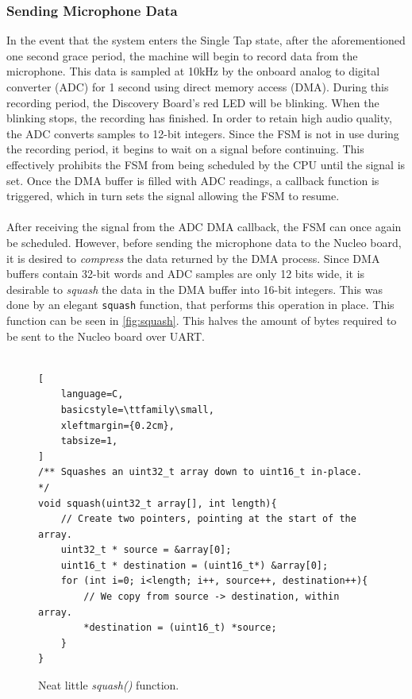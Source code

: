 \subsubsection{Sending Microphone Data}
In the event that the system enters the Single Tap state, after the aforementioned one second grace
period, the machine will begin to record data from the microphone. This data is sampled at 10kHz by
the onboard analog to digital converter (ADC) for 1 second using direct memory access (DMA). During
this recording period, the Discovery Board's red LED will be blinking. When the blinking stops, the
recording has finished. In
order to retain high audio quality, the ADC converts samples to 12-bit integers. Since
the FSM is not in use during the recording period, it begins to wait on a signal before continuing.
This effectively prohibits the FSM from being scheduled by the CPU until the signal is set. Once
the DMA buffer is filled with ADC readings, a callback function is triggered, which in turn sets the
signal allowing the FSM to resume.\\\\
After receiving the signal from the ADC DMA callback, the FSM can once again be scheduled. However,
before sending the microphone data to the Nucleo board, it is desired to \textit{compress} the data
returned by the DMA process. Since DMA buffers contain 32-bit words and ADC samples are only 12 bits
wide, it is desirable to \textit{squash} the data in the DMA buffer into 16-bit integers. This was
done by an elegant \texttt{squash} function, that performs this operation in place. This function can be seen in \autoref{fig:squash}. This halves the
amount of bytes required to be sent to the Nucleo board over UART.\\\\

\begin{figure}[h]
\begin{lstlisting}[
	language=C,
	basicstyle=\ttfamily\small,
	xleftmargin={0.2cm},
	tabsize=1,
]
/** Squashes an uint32_t array down to uint16_t in-place. */
void squash(uint32_t array[], int length){
	// Create two pointers, pointing at the start of the array.
	uint32_t * source = &array[0];
	uint16_t * destination = (uint16_t*) &array[0];
	for (int i=0; i<length; i++, source++, destination++){
		// We copy from source -> destination, within array.
		*destination = (uint16_t) *source;
	}
}
\end{lstlisting}
\caption{\label{fig:squash}Neat little \textit{squash()} function.}
\end{figure}







